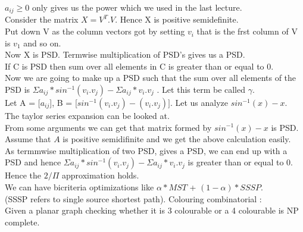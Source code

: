 \documentclass[solution,addpoints,12pt]{exam}
\begin{document}
$a_{ij} \ge 0$ only gives us the power which we used in the last lecture.\\
Consider the matrix $X = V^T.V$. Hence X is positive semidefinite.\\
Put down V as the column vectors got by setting $v_i$ that is the
frst column of V is $v_1$ and so on.\\
Now X is PSD. Termwise multiplication of PSD's gives us a PSD.\\
If C is PSD then sum over all elements in C is greater than or
equal to 0.\\
Now we are going to make up a PSD such that the sum over all
elements of the PSD is $\Sigma a_{ij}*{sin}^{-1}(v_i.v_j) - \Sigma a_{ij}*v_i.v_j$ . Let this term be called $\gamma$.\\

Let A = [$a_{ij}$], B = [${sin}^{-1}(v_i.v_j) - (v_i.v_j)]$.
Let us analyze ${sin}^{-1}(x) - x$.\\

The taylor series expansion can be looked at.\\
From some arguments we can get that matrix formed by ${sin}^{-1}(x) - x$ is
PSD.\\
Assume that $A$ is positive semidifinite and we get the above calculation easily.\\
As termmwise multiplication of two PSD, gives a PSD, we can end up with a PSD
and hence $\Sigma a_{ij}*{sin}^{-1}(v_i.v_j) - \Sigma a_{ij}*v_i.v_j$ is greater
than or equal to 0. Hence the $2/\Pi$ approximation holds.\\

We can have bicriteria optimizations like $\alpha*MST$ + $(1-\alpha)*SSSP$.\\
(SSSP refers to single source shortest path).
Colouring combinatorial :\\
Given a planar graph checking whether it is 3 colourable or a
4 colourable is NP complete.\\
\end{document}
